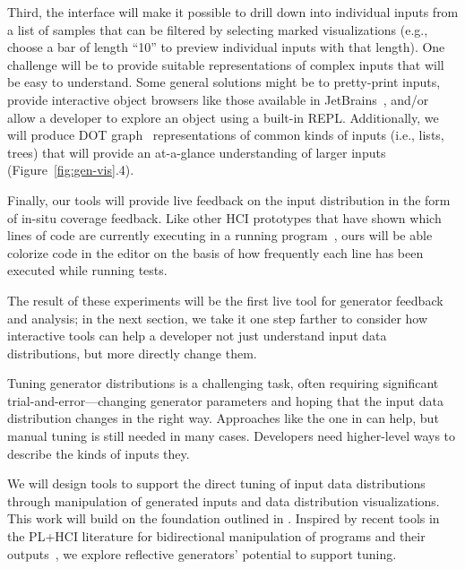 Third, the interface will make it possible to drill down into
individual inputs from a list of samples that can be
filtered by selecting marked visualizations (e.g., choose a bar
of length ``10'' to preview individual inputs with that length). One
challenge will be to provide suitable representations of complex inputs that
will be easy to understand. Some general solutions might be to
pretty-print inputs, provide interactive object browsers like those available
in JetBrains~\cite{tool:jetbrains}, and/or allow a developer to explore an
object using a built-in REPL. Additionally, we will produce DOT
graph~\cite{ellson_graphviz_2002} representations of common kinds of inputs
(i.e., lists, trees) that will provide an at-a-glance understanding of
larger inputs (Figure~\ref{fig:gen-vis}.4).

Finally, our tools will provide live feedback on the input
distribution in the form of in-situ coverage feedback. Like other HCI
prototypes that have shown which lines of code are currently
executing in a running program~\cite{ref:brandt2010rehearse,
  ref:oney2009firecrystal, ref:burg2013record}, ours will be
able colorize code in the editor on the basis of
how frequently each line has been executed while running tests.

The result of these experiments will be the first live tool for generator
feedback and analysis; in the next section, we take it one step
farther to consider how interactive tools can help a developer not
just understand input data distributions, but more directly change
them.

%
Tuning generator distributions is a challenging task, often requiring
significant trial-and-error---changing generator parameters and hoping
that the input data distribution changes in the right way. Approaches
like the one in  can help, but manual tuning
is still needed in many cases.
Developers need higher-level ways to describe the kinds of inputs they.

We will design tools to support the direct tuning of input data distributions
through manipulation of generated inputs and data distribution
visualizations. This work will build on the foundation outlined in
. Inspired by recent tools in
the PL+HCI literature
for bidirectional manipulation of programs and their
outputs~\cite{ref:hempel2019sketch, ref:kery2020mage,
  ref:omar2012active, ref:omar2021filling},
we explore reflective generators' potential to support tuning.

